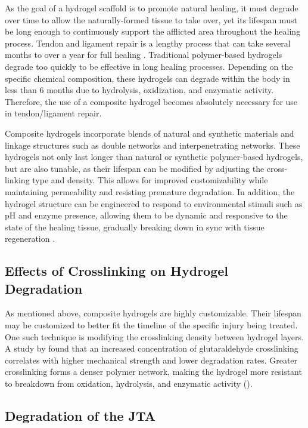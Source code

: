 As the goal of a hydrogel scaffold is to promote natural healing, it must degrade over time to
allow the naturally-formed tissue to take over, yet its lifespan must be long enough to
continuously support the afflicted area throughout the healing process. Tendon and ligament
repair is a lengthy process that can take several months to over a year for full healing \autocite{RN1}. Traditional polymer-based hydrogels degrade too quickly to be effective in long healing
processes. Depending on the specific chemical composition, these hydrogels can degrade
within the body in less than 6 months due to hydrolysis, oxidization, and enzymatic activity.
Therefore, the use of a composite hydrogel becomes absolutely necessary for use in
tendon/ligament repair.

Composite hydrogels incorporate blends of natural and synthetic materials and linkage
structures such as double networks and interpenetrating networks. These hydrogels not only
last longer than natural or synthetic polymer-based hydrogels, but are also tunable, as their
lifespan can be modified by adjusting the cross-linking type and density. This allows for
improved customizability while maintaining permeability and resisting premature degradation. In
addition, the hydrogel structure can be engineered to respond to environmental stimuli such as
pH and enzyme presence, allowing them to be dynamic and responsive to the state of the
healing tissue, gradually breaking down in sync with tissue regeneration \autocite{RN3}.

\subsection{Effects of Crosslinking on Hydrogel Degradation
}

As mentioned above, composite hydrogels are highly customizable. Their lifespan may be
customized to better fit the timeline of the specific injury being treated. One such technique is
modifying the crosslinking density between hydrogel layers. A study by \autocite{RN4} found that an
increased concentration of glutaraldehyde crosslinking correlates with higher mechanical
strength and lower degradation rates. Greater crosslinking forms a denser polymer network,
making the hydrogel more resistant to breakdown from oxidation, hydrolysis, and enzymatic
activity (\citeyear{RN4}).

\subsection{Degradation of the JTA}

